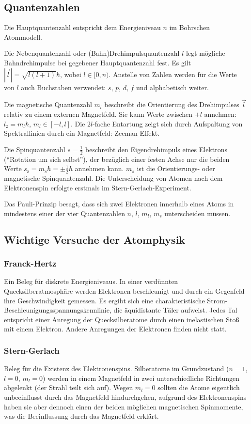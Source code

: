 \documentclass[a4paper]{scrartcl}
\begin{document}
\subsection{Quantenzahlen}
Die Hauptquantenzahl entspricht dem Energieniveau $n$ im Bohrschen Atommodell.

Die Nebenquantenzahl oder (Bahn)Drehimpulsquantenzahl $l$ legt mögliche Bahndrehimpulse bei gegebener Hauptquantenzahl fest. Es gilt $|\vec l| = \sqrt{l(l+1)}\hbar$, wobei $l \in [0, n)$. Anstelle von Zahlen werden für die Werte von $l$ auch Buchstaben verwendet: $s$, $p$, $d$, $f$ und alphabetisch weiter.

Die magnetische Quantenzahl $m_l$ beschreibt die Orientierung des Drehimpulses $\vec l$ relativ zu einem externen Magnetfeld. Sie kann Werte zwischen $\pm l$ annehmen: $l_\text{z} = m_l\hbar$, $m_l \in [-l, l]$. Die $2l$-fache Entartung zeigt sich durch Aufspaltung von Spektrallinien durch ein Magnetfeld: Zeeman-Effekt.

Die Spinquantenzahl $s = \frac{1}{2}$ beschreibt den Eigendrehimpuls eines Elektrons ("`Rotation um sich selbst"'), der bezüglich einer festen Achse nur die beiden Werte $s_\text{z} = m_s\hbar = \pm \frac{1}{2}\hbar$ annehmen kann. $m_s$ ist die Orientierungs- oder magnetische Spinquantenzahl. Die Unterscheidung von Atomen nach dem Elektronenspin erfolgte erstmals im Stern-Gerlach-Experiment.

Das Pauli-Prinzip besagt, dass sich zwei Elektronen innerhalb eines Atoms in mindestens einer der vier Quantenzahlen $n$, $l$, $m_l$, $m_s$ unterscheiden müssen.


\subsection{Wichtige Versuche der Atomphysik}
\subsubsection{Franck-Hertz}
Ein Beleg für diskrete Energieniveaus. In einer verdünnten Quecksilberatmosphäre werden Elektronen beschleunigt und durch ein Gegenfeld ihre Geschwindigkeit gemessen. Es ergibt sich eine charakteristische Strom-Beschleunigungsspannungskennlinie, die äquidistante Täler aufweist. Jedes Tal entspricht einer Anregung der Quecksilberatome durch einen inelastischen Stoß mit einem Elektron. Andere Anregungen der Elektronen finden nicht statt.

\subsubsection{Stern-Gerlach}
Beleg für die Existenz des Elektronenspins. Silberatome im Grundzustand ($n=1$, $l=0$, $m_l = 0$) werden in einem Magnetfeld in zwei unterschiedliche Richtungen abgelenkt (der Strahl teilt sich auf). Wegen $m_l = 0$ sollten die Atome eigentlich unbeeinflusst durch das Magnetfeld hindurchgehen, aufgrund des Elektronenspins haben sie aber dennoch einen der beiden möglichen magnetischen Spinmomente, was die Beeinflussung durch das Magnetfeld erklärt.
\end{document}
